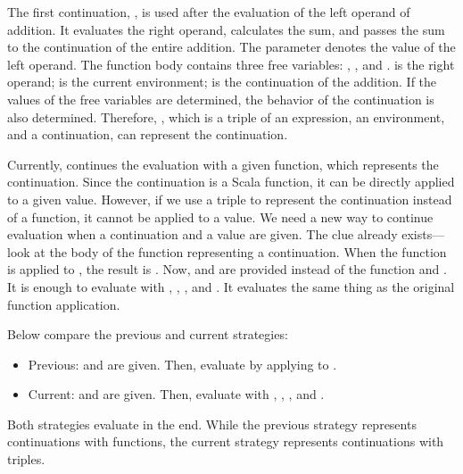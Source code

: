 The first continuation, , is used after the evaluation of the left operand of addition. It
evaluates the right operand, calculates the sum, and passes the sum to the
continuation of the entire addition. The parameter  denotes the value of
the left operand. The function body contains three free variables: ,
, and .  is the right operand;  is the
current environment;  is the continuation of the addition.
If the values of the free variables are determined, the
behavior of the continuation is also determined. Therefore, ,
which is a triple of an expression, an environment, and a continuation,
can represent the continuation.

Currently,  continues the evaluation with a given function, which
represents the continuation. Since the continuation is a Scala function, it can be
directly applied to a given value. However, if we use a triple to represent the
continuation instead of a function, it cannot be applied to a value. We need a new
way to continue evaluation when a continuation and a value are given. The clue
already exists---look at the body of the function representing a continuation.
When the function is applied to , the result is . Now,  and  are
provided instead of the function and . It is enough to evaluate
 with ,
, , and . It evaluates the same thing as the
original function application.

Below compare the previous and current strategies:

\begin{itemize}
  \item Previous:  and
   are given. Then, evaluate  by applying  to .
  \item Current:  and  are given. Then, evaluate
   with ,
  , , and .
\end{itemize}

Both strategies evaluate  in the end. While the previous strategy represents continuations with
functions, the current strategy represents continuations with triples.

